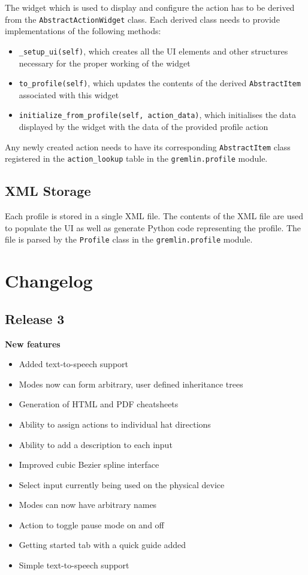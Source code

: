 \documentclass[a4, 10pt]{article}
\begin{document}
The widget which is used to display and configure the action has to be
derived from the \verb+AbstractActionWidget+ class. Each derived class
needs to provide implementations of the following methods:
\begin{itemize}
    \item \verb+_setup_ui(self)+, which creates all the UI elements and
        other structures necessary for the proper working of the widget
    \item \verb+to_profile(self)+, which updates the contents of the
        derived \verb+AbstractItem+ associated with this widget
    \item \verb+initialize_from_profile(self, action_data)+, which
        initialises the data displayed by the widget with the data of
        the provided profile action
\end{itemize}

Any newly created action needs to have its corresponding
\verb+AbstractItem+ class registered in the \verb+action_lookup+ table
in the \verb+gremlin.profile+ module.


\subsection{XML Storage}

Each profile is stored in a single XML file. The contents of the XML
file are used to populate the UI as well as generate Python code
representing the profile. The file is parsed by the \verb+Profile+ class
in the \verb+gremlin.profile+ module.



\section{Changelog}

\subsection{Release 3}

\textbf{New features}
\begin{itemize}
    \item Added text-to-speech support
    \item Modes now can form arbitrary, user defined inheritance trees
    \item Generation of HTML and PDF cheatsheets
    \item Ability to assign actions to individual hat directions
    \item Ability to add a description to each input
    \item Improved cubic Bezier spline interface
    \item Select input currently being used on the physical device
    \item Modes can now have arbitrary names
    \item Action to toggle pause mode on and off
    \item Getting started tab with a quick guide added
    \item Simple text-to-speech support
\end{itemize}
\end{document}
